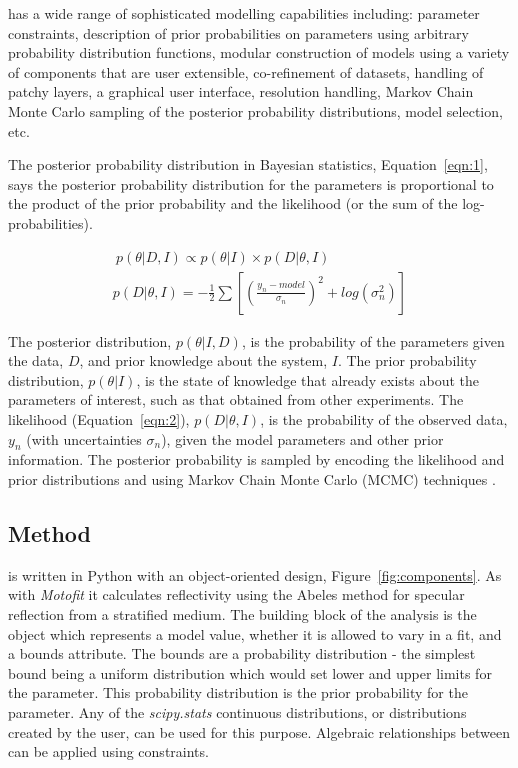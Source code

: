 \documentclass[12pt]{article}
\begin{document}
 has a wide range of sophisticated modelling capabilities including: parameter constraints, description of prior probabilities on parameters using arbitrary probability distribution functions, modular construction of models using a variety of components that are user extensible, co-refinement of datasets, handling of patchy layers, a graphical user interface, resolution handling, Markov Chain Monte Carlo sampling of the posterior probability distributions, model selection, etc.

The posterior probability distribution in Bayesian statistics, Equation~\ref{eqn:1}, says the posterior probability distribution for the parameters is proportional to the product of the prior probability and the likelihood (or the sum of the log-probabilities).

\begin{gather} 
\label{eqn:1}\ p(\theta | D, I) \propto p(\theta | I)\times p(D | \theta, I)\\
p(D | \theta, I) = -\frac{1}{2} \sum [(\frac{y_n - model} {\sigma_n})^2 + log(\sigma_n^2)]\label{eqn:2}
\end{gather}

The posterior distribution, $p(\theta | I, D)$, is the probability of the parameters given the data, $D$, and prior knowledge about the system, $I$. 
The prior probability distribution, $p(\theta | I)$, is the state of knowledge that already exists about the parameters of interest, such as that obtained from other experiments.
The likelihood (Equation~\ref{eqn:2}), $p(D | \theta, I)$, is the probability of the observed data, $y_n$ (with uncertainties $\sigma_n$), given the model parameters and other prior information.  The posterior probability is sampled by encoding the likelihood and prior distributions and using Markov Chain Monte Carlo (MCMC) techniques \cite{emcee}.

\subsection*{Method}
 is written in Python with an object-oriented design, Figure~\ref{fig:components}. As with \emph{Motofit} \cite{Nelson2006} it calculates reflectivity using the Abeles method \cite{Heavens1955} for specular reflection from a stratified medium.
The building block of the analysis is the \Parameter object which represents a model value, whether it is allowed to vary in a fit, and a bounds attribute. The bounds are a probability distribution - the simplest bound being a uniform distribution which would set lower and upper limits for the parameter. This probability distribution is the prior probability for the parameter. Any of the \emph{scipy.stats} \cite{Jones2001-2017} continuous distributions, or distributions created by the user, can be used for this purpose. Algebraic relationships between \Parameter can be applied using constraints.
\end{document}
